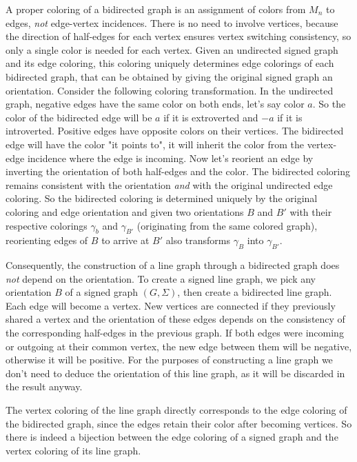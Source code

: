 A proper coloring of a bidirected graph is an assignment of colors from $M_n$ to edges, \textit{not} edge-vertex incidences. 
There is no need to involve vertices, because the direction of half-edges for each vertex ensures vertex switching consistency, so only a single color is needed for each vertex.
Given an undirected signed graph and its edge coloring, this coloring uniquely determines edge colorings of each bidirected graph, that can be obtained by giving the original signed graph an orientation.
Consider the following coloring transformation. In the undirected graph, negative edges have the same color on both ends, let's say color $a$. So the color of the bidirected edge will be $a$ if it is extroverted and $-a$ if it is introverted.
Positive edges have opposite colors on their vertices. The bidirected edge will have the color "it points to", it will inherit the color from the vertex-edge incidence where the edge is incoming.
Now let's reorient an edge by inverting the orientation of both half-edges and the color. The bidirected coloring remains consistent with the orientation \textit{and} with the original undirected edge coloring.
So the bidirected coloring is determined uniquely by the original coloring and edge orientation and given two orientations $B$ and $B'$ with their respective colorings $\gamma _b$ and $\gamma _{B'}$ (originating from the same colored graph),
reorienting edges of $B$ to arrive at $B'$ also transforms $\gamma _B$ into $\gamma _{B'}$.

Consequently, the construction of a line graph through a bidirected graph does \textit{not} depend on the orientation. To create a signed line graph,
we pick any orientation $B$ of a signed graph $(G, \Sigma)$, then create a bidirected line graph. Each edge will become a vertex.
New vertices are connected if they previously shared a vertex and the orientation of these edges depends on the consistency of the corresponding half-edges in the previous graph.
If both edges were incoming or outgoing at their common vertex, the new edge between them will be negative, otherwise it will be positive. 
For the purposes of constructing a line graph we don't need to deduce the orientation of this line graph, as it will be discarded in the result anyway.

The vertex coloring of the line graph directly corresponds to the edge coloring of the bidirected graph, since the edges retain their color after becoming vertices.
So there is indeed a bijection between the edge coloring of a signed graph and the vertex coloring of its line graph.

